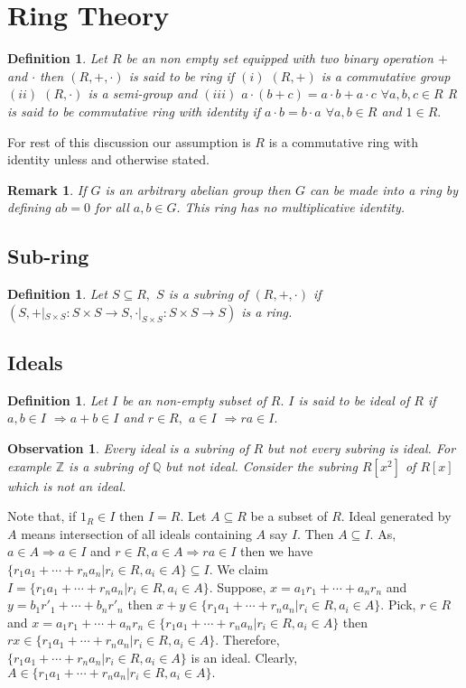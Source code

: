 \documentclass[11pt]{amsart}
\newtheorem{definition}[theorem]{Definition}%
\newtheorem{obs}[theorem]{Observation}
\newtheorem{remark}[theorem]{Remark}%
\newcommand{\QQ}{\mathbb Q}
\newcommand{\ZZ}{\mathbb Z}
\begin{document}
\section{Ring Theory}
\begin{definition}
Let $R$ be an non empty set equipped with two binary operation $+$ and $\cdot $ then $(R,+,\cdot )$ is said to be ring if 
\newline $(i)$ $(R,+)$ is a commutative group
\newline $(ii)$ $(R,\cdot )$ is a semi-group and
\newline $(iii)$ $a\cdot (b+c)=a\cdot b+a\cdot c$ $\forall a,b,c \in R$
\newline R is said to be commutative ring with identity if $a\cdot b=b\cdot a$ $\forall a,b \in R$ and $1 \in R.$
\end{definition}
For rest of this discussion our assumption is $R$ is a commutative ring with identity unless and otherwise stated.
\begin{remark}
If $G$ is an arbitrary abelian group then $G$ can be made into a ring by defining $ab=0$ for all $a,b\in G.$ This ring has no multiplicative identity.
\end{remark}
\subsection{Sub-ring}
\begin{definition}
Let $S \subseteq R,$ $S$ is a subring of $(R,+,\cdot)$ if $(S,+|_{S\times S}: S\times S \rightarrow S,\cdot |_{S\times S}: S\times S \rightarrow S)$ is a ring.
\end{definition}
\subsection{Ideals}
\begin{definition}
Let $I$ be an non-empty subset of $R.$ $I$ is said to be ideal of $R$ if $a,b\in I$ $\Rightarrow a+b \in I$ and $r \in R,$ $a\in I$ $\Rightarrow ra \in I.$
\end{definition}
\begin{obs}
Every ideal is a subring of $R$ but not every subring is ideal. For example ${\ZZ}$ is a subring of ${\QQ}$ but not ideal. Consider the subring $R[x^2]$ of $R[x]$ which is not an ideal.
\end{obs}
Note that, if $1_{R} \in I$ then $I=R.$
Let $A\subseteq R$ be a subset of $R$. Ideal generated by $A$ means intersection of all ideals containing $A$ say $I.$ Then $A\subseteq I.$ As, $a\in A\Rightarrow a\in I$ and $r\in R,a\in A \Rightarrow ra\in I$ then we have $\{r_1a_1+\cdots +r_na_n|r_i\in R,a_i\in A\}\subseteq I.$ We claim $I=\{r_1a_1+\cdots +r_na_n|r_i\in R,a_i\in A\}$.
\proof Suppose, $x=a_1r_1+\cdots +a_nr_n$ and $y=b_1r'_1+\cdots +b_nr'_n$ then $x+y\in \{r_1a_1+\cdots +r_na_n|r_i\in R,a_i\in A\}.$ Pick, $r\in R$ and $x=a_1r_1+\cdots +a_nr_n\in \{r_1a_1+\cdots +r_na_n|r_i\in R,a_i\in A\}$ then $rx\in \{r_1a_1+\cdots +r_na_n|r_i\in R,a_i\in A\}.$ Therefore, $\{r_1a_1+\cdots +r_na_n|r_i\in R,a_i\in A\}$ is an ideal. Clearly, $A\in \{r_1a_1+\cdots +r_na_n|r_i\in R,a_i\in A\}.$            %
\end{document}
